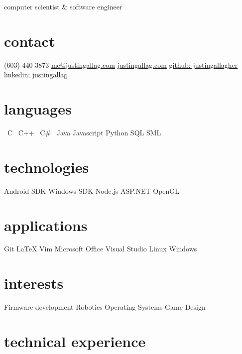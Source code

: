 \documentclass[print]{template/friggeri-cv}
\newcommand{\starr}{\raisebox{0.2ex}{$\star $}}
\begin{document}
    {computer scientist \& software engineer}

    \begin{aside}
        \section{contact}
            (603) 440-3873
            \href{mailto:me@justingallag.com}{me@justingallag.com}
            \href{http://justingallag.com}{justingallag.com}
            \href{https://github.com/justingallagher}{github: justingallagher}
            \href{https://www.linkedin.com/in/justingallag}{linkedin: justingallag}
        \section{languages}
            \starr \ C
            \starr \ C++
            \starr \ C\#
            \starr \ Java
            Javascript
            Python
            SQL
            SML
        \section{technologies}
            Android SDK
            Windows SDK
            Node.js
            ASP.NET
            OpenGL
        \section{applications}
            Git
            LaTeX
            Vim
            Microsoft Office
            Visual Studio
            Linux
            Windows
        \section{interests}
            Firmware development
            Robotics
            Operating Systems
            Game Design
    \end{aside}

    \section{technical experience}
\end{document}
